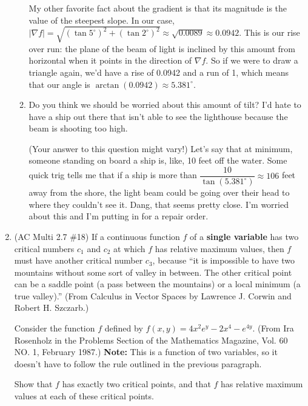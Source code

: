 \documentclass[10pt]{article}
\newcommand\del\nabla
\newenvironment{red}{\color{red}}{\ignorespacesafterend}
\begin{document}
\begin{enumerate}[leftmargin=0pt]
\begin{enumerate}
        \begin{red}
        My other favorite fact about the gradient is that its magnitude is the value of the steepest slope. In our case, $|\del f| = \sqrt{(\tan 5^\circ)^2 + (\tan 2^\circ)^2} \approx \sqrt{0.0089} \approx 0.0942.$ This is our rise over run: the plane of the beam of light is inclined by this amount from horizontal when it points in the direction of $\del f$. So if we were to draw a triangle again, we'd have a rise of 0.0942 and a run of 1, which means that our angle is $\arctan(0.0942) \approx 5.381^\circ.$
        \end{red}
        \item Do you think we should be worried about this amount of tilt? I'd hate to have a ship out there that isn't able to see the lighthouse because the beam is shooting too high.
        
        \begin{red}
        (Your answer to this question might vary!) Let's say that at minimum, someone standing on board a ship is, like, 10 feet off the water. Some quick trig tells me that if a ship is more than $\dfrac{10}{\tan(5.381^\circ)} \approx 106$ feet away from the shore, the light beam could be going over their head to where they couldn't see it. Dang, that seems pretty close. I'm worried about this and I'm putting in for a repair order.
        \end{red}
    \end{enumerate}
    \item (AC Multi 2.7 \#18) If a continuous function $f$ of a \textbf{single variable} has two critical numbers $c_1$ and $c_2$ at which $f$ has relative maximum values, then $f$ must have another critical number $c_3$, because ``it is impossible to have two mountains without some sort of valley in between. The other critical point can be a saddle point (a pass between the mountains) or a local minimum (a true valley).'' (From Calculus in Vector Spaces by Lawrence J. Corwin and Robert H. Szczarb.)
    
    Consider the function $f$ defined by $f(x,y) = 4x^2e^y -2x^4 -e^{4y}.$ (From Ira Rosenholz in the Problems Section of the Mathematics Magazine, Vol. 60 NO. 1, February 1987.) \textbf{Note:} This is a function of two variables, so it doesn't have to follow the rule outlined in the previous paragraph.
    
    Show that $f$ has exactly two critical points, and that $f$ has relative maximum values at each of these critical points. 
    

\end{enumerate}
\end{document}
